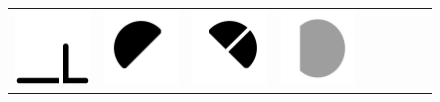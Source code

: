 \documentclass[doc]{apa6}
\newcommand{\stimulusscale}{.1}
\begin{document}
\begin{figure}[t]
\begin{center}
\begin{tabular}{c|cccccccc}
\includegraphics[scale=\stimulusscale]{./set30stim75.png} &
\includegraphics[scale=\stimulusscale]{./set31stim75.png} &
\includegraphics[scale=\stimulusscale]{./set32stim75.png} &
\includegraphics[scale=\stimulusscale]{./set33stim75.png} &

\end{tabular}
\end{center}
\end{figure}
\end{document}
